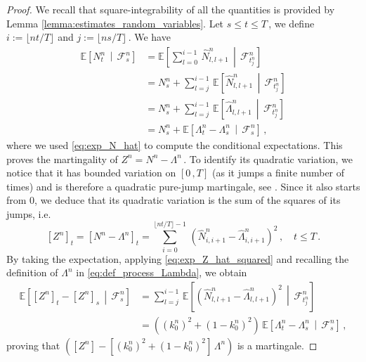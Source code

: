 \documentclass{article}
\newcommand{\1}{\mathbbm{1}}
\numberwithin{equation}{section}
\begin{document}
\begin{proof}
    We recall that square-integrability of all the quantities is provided by Lemma \ref{lemma:estimates_random_variables}. Let $s \leq t \leq T\,$, we define $i := \lfloor nt/T\rfloor$ and $j := \lfloor ns/T \rfloor\,$. We have 
    \begin{align*}
        \mathbb E \left[N^n_t \,\middle|\, \mathcal F^n_s\right] &= \mathbb E \left[\sum_{l = 0}^{i - 1}\, \widehat N^n_{l,l+1}\, \middle|\, \mathcal F^n_{t^n_j} \right] \\
        &= N^n_s + \sum_{l = j}^{i-1}\, \mathbb E \left[ \widehat N^n_{l,l+1}\,\middle|\, \mathcal F^n_{t^n_j}\right] \\
        &= N^n_s + \sum_{l = j}^{i-1}\, \mathbb E \left[ \widehat \Lambda^n_{l,l+1}\,\middle|\, \mathcal F^n_{t^n_j}\right] \\
        &= N^n_s + \mathbb{E}\left[\Lambda^n_t - \Lambda^n_s\,\middle|\, \mathcal F^n_s\right] \,,
    \end{align*}
where we used \eqref{eq:exp_N_hat} to compute the conditional expectations.
This proves the martingality of $Z^n = N^n - \Lambda^n\,$. To identify its quadratic variation, we notice that it has bounded variation on $[0\,,T]$ (as it jumps a finite number of times) and is therefore a quadratic pure-jump martingale, see \citet[Theorem~II.26]{protter2005stochastic}. Since it also starts from 0, we deduce that its quadratic variation is the sum of the squares of its jumps, i.e.
$$
\left[Z^n\right]_t = \left[N^n - \Lambda^n  \right]_t = \sum_{i = 0}^{\lfloor nt/T \rfloor - 1}\, \left(\widehat N^n_{i,i+1} -  \widehat \Lambda^n_{i,i+1}\right)^2\,, \quad t \leq T\,.
$$
By taking the expectation, applying \eqref{eq:exp_Z_hat_squared} and recalling the definition of $\Lambda^n$ in \eqref{eq:def_process_Lambda}, we obtain 
\begin{align*}
    \mathbb E \left[[Z^n]_t - [Z^n]_s\,\middle |\, \mathcal F^n_s \right] &= \sum_{l = j}^{i - 1}\, \mathbb E \left[\left(\widehat N^n_{l,l+1} - \widehat \Lambda^n_{l,l+1}\right)^2\,\middle |\,\mathcal F^n_{t^n_j} \right] \\
    &= \left(\left(k_0^n\right)^2 + \left(1 - k_0^n\right)^2\right)\, \mathbb E \left[\Lambda^n_t - \Lambda^n_s\,\middle |\, \mathcal F^n_s\right] \,,
\end{align*}
proving that $\left([Z^n] - \left[\left(k_0^n\right)^2 + \left(1 - k_0^n\right)^2\right]\, \Lambda^n\right)$ is a martingale.
\end{proof}
\end{document}
